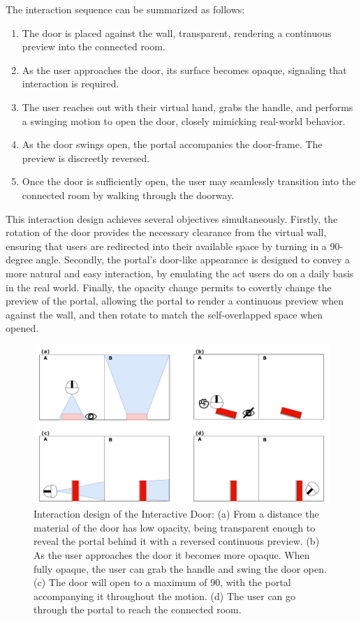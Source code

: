 The interaction sequence can be summarized as follows:

\begin{enumerate}
  \item The door is placed against the wall, transparent, rendering a continuous preview into the connected room.
  \item As the user approaches the door, its surface becomes opaque, signaling that interaction is required.
  \item The user reaches out with their virtual hand, grabs the handle, and performs a swinging motion to open the door, closely mimicking 
  real-world behavior.
  \item As the door swings open, the portal accompanies the door-frame. The preview is discreetly reversed.
  \item Once the door is sufficiently open, the user may seamlessly transition into the connected room by walking through the doorway.
\end{enumerate}

This interaction design achieves several objectives simultaneously. Firstly, the rotation of the door provides the necessary clearance from the 
virtual wall, ensuring that users are redirected into their available space by turning in a 90-degree angle. Secondly, the portal's door-like 
appearance is designed to convey a more natural and easy interaction, by emulating the act users do on a daily basis in the real world. 
Finally, the opacity change permits to covertly change the preview of the portal, allowing the portal to render a continuous preview when 
against the wall, and then rotate to match the self-overlapped space when opened.

\begin{figure}[t]
    \centering
     \includegraphics[width=\textwidth]{NOVAthesisFiles/Images/schemes/door-interaction.pdf}
     \caption[Interaction design of the Interactive Door.]
     {Interaction design of the Interactive Door: (a) From a distance the material of the door has low opacity, being transparent enough to 
     reveal the portal behind it with a reversed continuous preview. (b) As the user approaches the door it becomes more opaque. When fully 
     opaque, the user can grab the handle and swing the door open. (c) The door will open to a maximum of 90\textdegree, with the portal accompanying 
     it throughout the motion. (d) The user can go through the portal to reach the connected room.}
     \label{fig:door-portal-interaction}
\end{figure}

